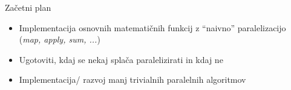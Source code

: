 \documentclass{beamer}
\begin{document}
\begin{frame}{Za\v cetni plan}
    \begin{itemize}
        \item Implementacija osnovnih matemati\v cnih funkcij z ``naivno'' paralelizacijo (\textit{map, apply, sum, ...})
        \item Ugotoviti, kdaj se nekaj spla\v ca paralelizirati in kdaj ne
        \item Implementacija/ razvoj manj trivialnih paralelnih algoritmov
    \end{itemize}

\end{frame}
\end{document}
